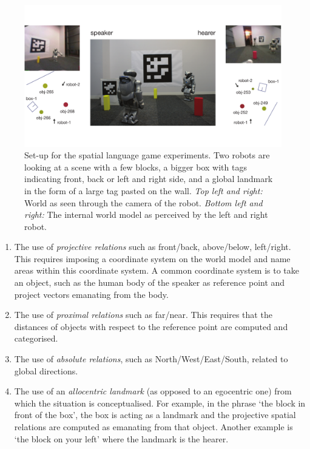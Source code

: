 \begin{figure}
\centerline{\includegraphics[width=0.8\linewidth]{chap11/figs/spatial.pdf}}
\caption{Set-up for the spatial language game experiments. Two robots are looking at a scene 
with a few blocks, a bigger box with tags indicating front, back or left and right side, and a global landmark in the form 
of a large tag pasted on the wall. {\itshape Top left and right:} World as seen through the camera of the robot. 
{\itshape Bottom left and right:} The internal world model as perceived by the left and right robot.}
\label{fig:spatial}
\end{figure}
\begin{enumerate}
\item The use of {\itshape projective relations} such as front/back, above/below, left/right. This requires imposing a coordinate
system on the world model and name areas within this coordinate system. A common coordinate system is to take 
an object, such as the human body of the speaker as reference point and project vectors emanating from the body. 
\item The use of {\itshape proximal relations} such as far/near. This requires that the distances of objects with respect to the 
reference point are computed and categorised. 
\item The use of {\itshape absolute relations}, such as North/West/East/South, related to global directions. 
\item The use of an {\itshape allocentric landmark} (as opposed to an egocentric one)
from which the situation is conceptualised. For example, in the 
phrase `the block in front of the box', the box is acting as a landmark and the projective spatial relations are 
computed as emanating from that object. Another example is `the block on your left' where the landmark is the 
hearer. 
\end{enumerate}


